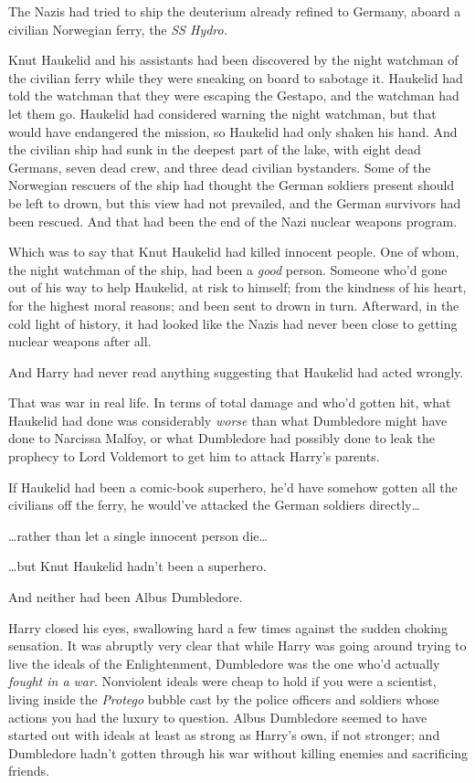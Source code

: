 The Nazis had tried to ship the deuterium already refined to Germany,
aboard a civilian Norwegian ferry, the \emph{SS Hydro.}

Knut Haukelid and his assistants had been discovered by the night
watchman of the civilian ferry while they were sneaking on board to
sabotage it. Haukelid had told the watchman that they were escaping the
Gestapo, and the watchman had let them go. Haukelid had considered
warning the night watchman, but that would have endangered the mission,
so Haukelid had only shaken his hand. And the civilian ship had sunk in
the deepest part of the lake, with eight dead Germans, seven dead crew,
and three dead civilian bystanders. Some of the Norwegian rescuers of
the ship had thought the German soldiers present should be left to
drown, but this view had not prevailed, and the German survivors had
been rescued. And that had been the end of the Nazi nuclear weapons
program.

Which was to say that Knut Haukelid had killed innocent people. One of
whom, the night watchman of the ship, had been a \emph{good} person.
Someone who'd gone out of his way to help Haukelid, at risk to himself;
from the kindness of his heart, for the highest moral reasons; and been
sent to drown in turn. Afterward, in the cold light of history, it had
looked like the Nazis had never been close to getting nuclear weapons
after all.

And Harry had never read anything suggesting that Haukelid had acted
wrongly.

That was war in real life. In terms of total damage and who'd gotten
hit, what Haukelid had done was considerably \emph{worse} than what
Dumbledore might have done to Narcissa Malfoy, or what Dumbledore had
possibly done to leak the prophecy to Lord Voldemort to get him to
attack Harry's parents.

If Haukelid had been a comic-book superhero, he'd have somehow gotten
all the civilians off the ferry, he would've attacked the German
soldiers directly\ldots{}

\ldots{}rather than let a single innocent person die\ldots{}

\ldots{}but Knut Haukelid hadn't been a superhero.

And neither had been Albus Dumbledore.

Harry closed his eyes, swallowing hard a few times against the sudden
choking sensation. It was abruptly very clear that while Harry was going
around trying to live the ideals of the Enlightenment, Dumbledore was
the one who'd actually \emph{fought in a war}. Nonviolent ideals were
cheap to hold if you were a scientist, living inside the \emph{Protego}
bubble cast by the police officers and soldiers whose actions you had
the luxury to question. Albus Dumbledore seemed to have started out with
ideals at least as strong as Harry's own, if not stronger; and
Dumbledore hadn't gotten through his war without killing enemies and
sacrificing friends.

